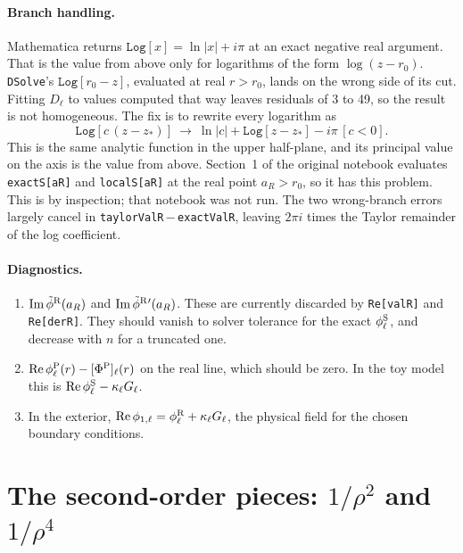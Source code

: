 \documentclass[11pt,a4paper]{article}
\renewcommand{\Re}{\operatorname{Re}}
\renewcommand{\Im}{\operatorname{Im}}
\newcommand{\phiS}{\phi^{\rm S}}
\newcommand{\phiR}{\phi^{\rm R}}
\newcommand{\code}[1]{\texttt{#1}}
\begin{document}
\paragraph{Branch handling.}
Mathematica returns $\code{Log}[x]=\ln|x|+i\pi$ at an exact negative real argument.
That is the value from above only for logarithms of the form $\log(z-r_0)$.
\code{DSolve}'s $\code{Log}[r_0-z]$, evaluated at real $r>r_0$, lands on the wrong side of its cut.
Fitting $D_\ell$ to values computed that way leaves residuals of 3 to 49, so the result is not homogeneous.
The fix is to rewrite every logarithm as
\begin{equation}
\code{Log}[c\,(z-z_*)]\ \to\ \ln|c|+\code{Log}[z-z_*]-i\pi\,[c<0].
\end{equation}
This is the same analytic function in the upper half-plane, and its principal value on the axis is the value from above.
Section~1 of the original notebook evaluates \code{exactS[aR]} and \code{localS[aR]} at the real point $a_R>r_0$, so it has this problem.
This is by inspection; that notebook was not run.
The two wrong-branch errors largely cancel in \code{taylorValR}\,$-$\,\code{exactValR}, leaving $2\pi i$ times the Taylor remainder of the log coefficient.

\paragraph{Diagnostics.}
\begin{enumerate}[nosep]
\item $\Im\tilde\phi^{\rm R}(a_R)$ and $\Im\tilde\phi^{\rm R}{}'(a_R)$.
  These are currently discarded by \code{Re[valR]} and \code{Re[derR]}.
  They should vanish to solver tolerance for the exact $\phiS_\ell$, and decrease with $n$ for a truncated one.
\item $\Re\phi^{\rm P}_\ell(r)-[\Phi^{\rm P}]_\ell(r)$ on the real line, which should be zero.
  In the toy model this is $\Re\phiS_\ell-\kappa_\ell G_\ell$.
\item In the exterior, $\Re\phi_{1,\ell}=\phiR_\ell+\kappa_\ell G_\ell$, the physical field for the chosen boundary conditions.
\end{enumerate}

\section{The second-order pieces: \texorpdfstring{$1/\rho^2$}{1/rho\^2} and \texorpdfstring{$1/\rho^4$}{1/rho\^4}}\label{sec:second}
\end{document}
